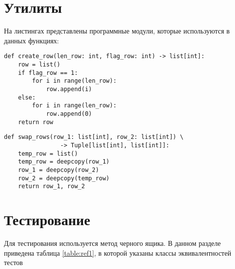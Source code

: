 \section{Утилиты}
На листингах представлены программные модули, которые используются в данных функциях:
\begin{lstlisting}[label=some-code,caption=Программный код создания для кэша в виде строки]
def create_row(len_row: int, flag_row: int) -> list[int]:
	row = list()
	if flag_row == 1:
		for i in range(len_row):
			row.append(i)
	else:
		for i in range(len_row):
			row.append(0)
	return row
\end{lstlisting}

\begin{lstlisting}[label=some-code,caption=Программный код создания для кэша в виде строки]
def swap_rows(row_1: list[int], row_2: list[int]) \
				-> Tuple[list[int], list[int]]:
	temp_row = list()
	temp_row = deepcopy(row_1)
	row_1 = deepcopy(row_2)
	row_2 = deepcopy(temp_row)
	return row_1, row_2
\end{lstlisting}

\section{Тестирование}
Для тестирования используется метод черного ящика. В данном разделе приведена таблица \ref{table:ref1}, в которой указаны классы эквивалентностей тестов \\

